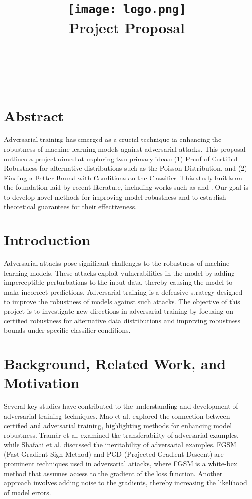 \documentclass{article}
\title{
    \texttt{[image: logo.png]} \\ %
    Project Proposal \par \exerciseset
}
\author{\ThirdAuther \\ \FourthAuther \\ \FirstAuther \\ \SecondAuther }
\begin{document}
\maketitle

\section*{Abstract} 
Adversarial training has emerged as a crucial technique in enhancing the robustness of machine learning models against adversarial attacks. This proposal outlines a project aimed at exploring two primary ideas: (1) Proof of Certified Robustness for alternative distributions such as the Poisson Distribution, and (2) Finding a Better Bound with Conditions on the Classifier. This study builds on the foundation laid by recent literature, including works such as \cite{cohen2024certified} and \cite{curse2024dimensionality}. Our goal is to develop novel methods for improving model robustness and to establish theoretical guarantees for their effectiveness. 

\section*{Introduction} 
Adversarial attacks pose significant challenges to the robustness of machine learning models. These attacks exploit vulnerabilities in the model by adding imperceptible perturbations to the input data, thereby causing the model to make incorrect predictions. Adversarial training is a defensive strategy designed to improve the robustness of models against such attacks. The objective of this project is to investigate new directions in adversarial training by focusing on certified robustness for alternative data distributions and improving robustness bounds under specific classifier conditions. 

\section{Background, Related Work, and Motivation} 
Several key studies have contributed to the understanding and development of adversarial training techniques. Mao et al. \cite{mao2023connecting} explored the connection between certified and adversarial training, highlighting methods for enhancing model robustness. Tramèr et al. \cite{tramèr2017space} examined the transferability of adversarial examples, while Shafahi et al. \cite{shafahi2018inevitable} discussed the inevitability of adversarial examples. FGSM (Fast Gradient Sign Method) and PGD (Projected Gradient Descent) are prominent techniques used in adversarial attacks, where FGSM is a white-box method that assumes access to the gradient of the loss function. Another approach involves adding noise to the gradients, thereby increasing the likelihood of model errors.
\end{document}
